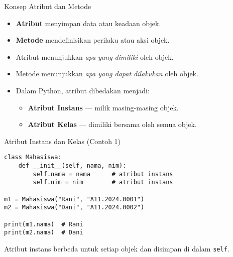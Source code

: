 \documentclass[aspectratio=169, table]{beamer}
\begin{document}
\begin{frame}[fragile]{Konsep Atribut dan Metode}
\vspace{20pt}
\begin{itemize}
    \item \textbf{Atribut} menyimpan data atau keadaan objek.
    \item \textbf{Metode} mendefinisikan perilaku atau aksi objek.
    \item Atribut menunjukkan \emph{apa yang dimiliki} oleh objek.
    \item Metode menunjukkan \emph{apa yang dapat dilakukan} oleh objek.
    \item Dalam Python, atribut dibedakan menjadi:
    \begin{itemize}
        \item \textbf{Atribut Instans} — milik masing-masing objek.
        \item \textbf{Atribut Kelas} — dimiliki bersama oleh semua objek.
    \end{itemize}
\end{itemize}
\end{frame}

\begin{frame}[fragile]{Atribut Instans dan Kelas (Contoh 1)}
\vspace{20pt}
\begin{lstlisting}[style=PythonStyle]
class Mahasiswa:
    def __init__(self, nama, nim):
        self.nama = nama      # atribut instans
        self.nim = nim        # atribut instans

m1 = Mahasiswa("Rani", "A11.2024.0001")
m2 = Mahasiswa("Dani", "A11.2024.0002")

print(m1.nama)  # Rani
print(m2.nama)  # Dani
\end{lstlisting}
Atribut instans berbeda untuk setiap objek dan disimpan di dalam \texttt{self}.
\end{frame}
\end{document}
